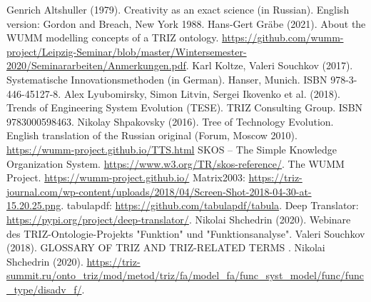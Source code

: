 \documentclass[11pt,a4paper]{article}
\begin{document}
\begin{thebibliography}{xxx}
\raggedright
{} Genrich Altshuller (1979).  Creativity as an exact
  science (in Russian). English version: Gordon and Breach, New York 1988.
 Hans-Gert Gr\"abe (2021). About the WUMM modelling
  concepts of a TRIZ ontology.  \url{https://github.com/wumm-project/Leipzig-Seminar/blob/master/Wintersemester-2020/Seminararbeiten/Anmerkungen.pdf}.
 Karl Koltze, Valeri Souchkov (2017).  Systematische
  Innovationsmethoden (in German).  Hanser, Munich. ISBN 978-3-446-45127-8.
 Alex Lyubomirsky, Simon Litvin, Sergei Ikovenko et al.
  (2018). Trends of Engineering System Evolution (TESE).  TRIZ Consulting
  Group. ISBN 9783000598463.
 Nikolay Shpakovsky (2016). Tree of Technology
  Evolution. English translation of the Russian original (Forum, Moscow
  2010).\\ \url{https://wumm-project.github.io/TTS.html}
 SKOS -- The Simple Knowledge Organization System.
  \url{https://www.w3.org/TR/skos-reference/}.  
 The WUMM Project. \url{https://wumm-project.github.io/} 
 Matrix2003: \url{https://triz-journal.com/wp-content/uploads/2018/04/Screen-Shot-2018-04-30-at-15.20.25.png}.
 tabulapdf: \url{https://github.com/tabulapdf/tabula}.
 Deep Translator: \url{https://pypi.org/project/deep-translator/}.
 Nikolai Shchedrin (2020). Webinare des TRIZ-Ontologie-Projekts "Funktion" und "Funktionsanalyse".
 Valeri Souchkov (2018). GLOSSARY OF TRIZ AND TRIZ-RELATED TERMS .
 Nikolai Shchedrin (2020). \url{https://triz-summit.ru/onto_triz/mod/metod/triz/fa/model_fa/func_syst_model/func/func_type/disadv_f/}.
\end{thebibliography}
\end{document}
